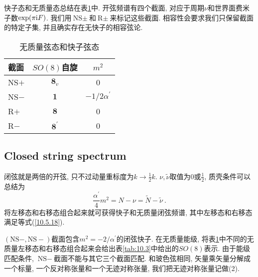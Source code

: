 快子态和无质量态总结在表\ref{tab:10.2}中. 开弦频谱有四个截面, 对应于周期$ \nu $和世界面费米子数$ \exp(\pi\mathrm{i} F)$. 我们用$ \text{NS}\pm $和$ \text{R}\pm $来标记这些截面. 相容性会要求我们只保留截面的特定子集, 并且确实存在无快子的相容弦论.
\begin{table}[h]
\caption{无质量弦态和快子弦态}
\label{tab:10.2}%
\centering
\begin{tabular}[c]{lcc}
\hline\hline
 \quad\vphantom{\Big(}截面 \quad &\quad $SO(8) $自旋 \quad &\quad  $m^{2}$\quad \\
\hline
\quad NS$+$ \quad & $\mathbf{8}_{v} $& 0 \\
\quad NS$-$ \quad & $\mathbf{1} $    & $-1/2\alpha^{\prime}$\\
\quad R$+$ \quad   & $\mathbf{8}   $  & 0\\
\quad R$-$ \quad  & $\mathbf{8}^{\prime}$ & 0 \\
 \hline\hline
\end{tabular}
\end{table}


\subsection*{Closed string spectrum}

闭弦就是两倍的开弦, 只不过动量重标度为$ k\to\frac{1}{2}k$. $\nu,\tilde{\nu} $取值为$ 0 $或$ \frac{1}{2}$, 质壳条件可以总结为
\begin{equation}
    \frac{\alpha^{\prime}}{4}m^{2} = N-\nu =\tilde{N} -\tilde{\nu} \:. \label{10.5.18}
\end{equation}
将左移态和右移态组合起来就可获得快子和无质量闭弦频谱, 其中左移态和右移态满足等式(\ref{10.5.18}).

$(\text{NS}-,\text{NS}-) $截面包含$ m^{2}=-2/\alpha^{\prime} $的闭弦快子. 在无质量能级, 将表\ref{tab:10.2}中不同的无质量左移态和右移态组合起来会给出表\ref{tab:10.3}中给出的$ SO(8) $表示. 由于能级匹配条件, $\text{NS}- $截面不能与其它三个截面匹配. 和玻色弦相同, 矢量乘矢量分解成一个标量, 一个反对称张量和一个无迹对称张量, 我们把无迹对称张量记做(2).


